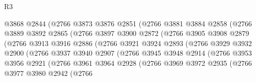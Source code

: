 \begin{lexlean}{R3}
\begin{coremodule}
                        @3868
                        @2844
                        (@2766
                          @3873
                          @3876
                          @2851
                          (@2766
                            @3881
                            @3884
                            @2858
                            (@2766
                              @3889
                              @3892
                              @2865
                              (@2766
                                @3897
                                @3900
                                @2872
                                (@2766
                                  @3905
                                  @3908
                                  @2879
                                  (@2766
                                    @3913
                                    @3916
                                    @2886
                                    (@2766
                                      @3921
                                      @3924
                                      @2893
                                      (@2766
                                        @3929
                                        @3932
                                        @2900
                                        (@2766
                                          @3937
                                          @3940
                                          @2907
                                          (@2766
                                            @3945
                                            @3948
                                            @2914
                                            (@2766
                                              @3953
                                              @3956
                                              @2921
                                              (@2766
                                                @3961
                                                @3964
                                                @2928
                                                (@2766
                                                  @3969
                                                  @3972
                                                  @2935
                                                  (@2766
                                                    @3977
                                                    @3980
                                                    @2942
                                                    (@2766

\end{coremodule}
\end{lexlean}
